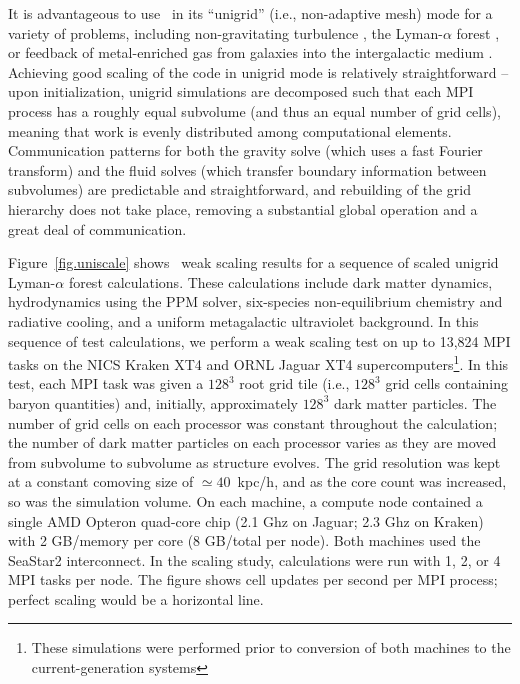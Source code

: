 It is advantageous to use \enzo\ in its ``unigrid'' (i.e.,
non-adaptive mesh) mode for a variety of problems, including
non-gravitating turbulence
\citep[e.g.,][]{2002ApJ...569L.127K,Kritsuk04, 2007ApJ...665..416K,
2009ASPC..406...15K}, the Lyman-$\alpha$ forest
\citep{2005MNRAS.361...70J,2009MNRAS.399.1934P}, or feedback of
metal-enriched gas from galaxies into the intergalactic medium
\citep{2004ApJ...601L.115N,2011ApJ...731....6S}.  Achieving good
scaling of the code in unigrid mode is relatively straightforward --
upon initialization, unigrid simulations are decomposed such that each
MPI process has a roughly equal subvolume (and thus an equal number of
grid cells), meaning that work is evenly distributed among
computational elements.  Communication patterns for both the gravity
solve (which uses a fast Fourier transform) and the fluid solves
(which transfer boundary information between subvolumes) are
predictable and straightforward, and rebuilding of the grid hierarchy
does not take place, removing a substantial global operation and a
great deal of communication.

Figure~\ref{fig.uniscale} shows \enzo\ weak scaling results for a
sequence of scaled unigrid Lyman-$\alpha$ forest calculations. These
calculations include dark matter dynamics, hydrodynamics using the PPM
solver, six-species non-equilibrium chemistry and radiative cooling,
and a uniform metagalactic ultraviolet background.  In this sequence
of test calculations, we perform a weak scaling test on up to 13,824
MPI tasks on the NICS Kraken XT4 and ORNL Jaguar XT4
supercomputers\footnote{These simulations were performed prior to
conversion of both machines to the current-generation systems}.  In
this test, each MPI task was given a $128^3$ root grid tile (i.e.,
$128^3$ grid cells containing baryon quantities) and, initially,
approximately $128^3$ dark matter particles.  The number of grid cells
on each processor was constant throughout the calculation; the number
of dark matter particles on each processor varies as they are moved
from subvolume to subvolume as structure evolves.  The grid resolution
was kept at a constant comoving size of $\simeq 40$~kpc/h, and as the
core count was increased, so was the simulation volume.  On each
machine, a compute node contained a single AMD Opteron quad-core chip
(2.1 Ghz on Jaguar; 2.3 Ghz on Kraken) with 2 GB/memory per core (8
GB/total per node).  Both machines used the SeaStar2 interconnect.  In
the scaling study, calculations were run with 1, 2, or 4 MPI tasks per
node.  The figure shows cell updates per second per MPI process;
perfect scaling would be a horizontal line.

